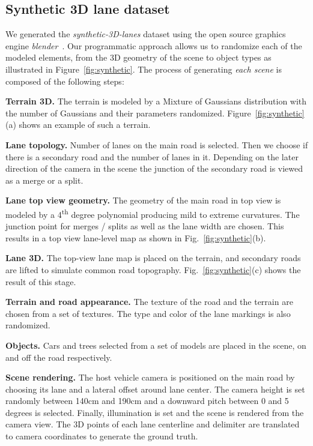 \documentclass[10pt,twocolumn,letterpaper]{article}
\begin{document}
\subsection{Synthetic 3D lane dataset}\label{sec:synthetic}
We generated the \emph{synthetic-3D-lanes} dataset using the open source graphics engine \textit{blender}~\cite{blender}. Our programmatic approach allows us to randomize each of the modeled elements, from the 3D geometry of the scene to object types as illustrated in Figure~\ref{fig:synthetic}. The process of generating \textit{each scene} is composed of the following steps:

\textbf{Terrain 3D.} The terrain is modeled by a Mixture of Gaussians distribution with the number of Gaussians and their parameters randomized. Figure~\ref{fig:synthetic}(a) shows an example of such a terrain.

\textbf{Lane topology.} Number of lanes on the main road is selected. Then we choose if there is a secondary road and the number of lanes in it. Depending on the later direction of the camera in the scene the junction of the secondary road is viewed as a merge or a split.

\textbf{Lane top view geometry.} The geometry of the main road in top view is modeled by a 4\textsuperscript{th} degree polynomial producing mild to extreme curvatures. The junction point for merges / splits as well as the lane width are chosen. This results in a top view lane-level map as shown in Fig.~\ref{fig:synthetic}(b).

\textbf{Lane 3D.} The top-view lane map is placed on the terrain, and secondary roads are lifted to simulate common road topography. Fig.~\ref{fig:synthetic}(c) shows the result of this stage.

\textbf{Terrain and road appearance.} The texture of the road and the terrain are chosen from a set of textures. The type and color of the lane markings is also randomized.


\textbf{Objects.} Cars and trees selected from a set of models are placed in the scene, on and off the road respectively.


\textbf{Scene rendering.} The host vehicle camera is positioned on the main road by choosing its lane and a lateral offset around lane center. The camera height is set randomly between 140cm and 190cm and a downward pitch between 0 and 5 degrees is selected. Finally, illumination is set and the scene is rendered from the camera view. The 3D points of each lane centerline and delimiter are translated to camera coordinates to generate the ground truth.  
\end{document}
